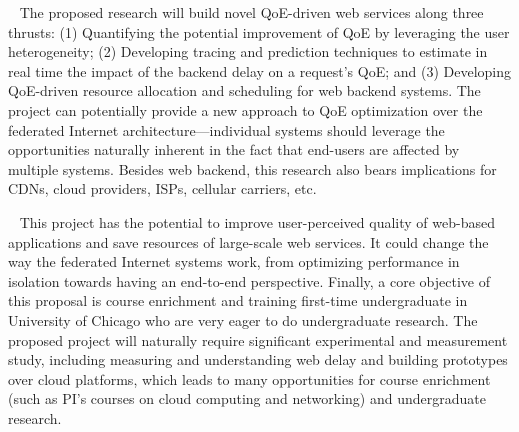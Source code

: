 \documentclass{proposalnsf}
\newcommand{\mypara}[1]{\smallskip\noindent{\bf {#1}:}~}
\begin{document}
\mypara{Intellectual merit}
The proposed research will build novel QoE-driven web services along three thrusts:
(1) Quantifying the potential improvement of QoE by leveraging the user heterogeneity;
(2) Developing tracing and prediction techniques to estimate in real time the impact of the backend delay on a request's QoE; and
(3) Developing QoE-driven resource allocation and scheduling for web backend systems.
The project can potentially provide a new approach to QoE optimization over the federated Internet architecture---individual systems should leverage the opportunities naturally inherent in the fact that end-users are affected by multiple systems.
Besides web backend, this research also bears implications for CDNs, cloud providers, ISPs, cellular carriers, etc.

\mypara{Broader impacts}
This project has the potential to improve user-perceived quality of web-based applications and save resources of large-scale web services.
It could change the way the federated Internet systems work, from optimizing performance in isolation towards having an end-to-end perspective.
Finally, a core objective of this proposal is course enrichment and training first-time undergraduate in University of Chicago who are very eager to do undergraduate research.
The proposed project will naturally require significant experimental and measurement study, including measuring and understanding web delay and building prototypes over cloud platforms, which leads to many opportunities for course enrichment (such as PI's courses on cloud computing and networking) and undergraduate research.
\end{document}
